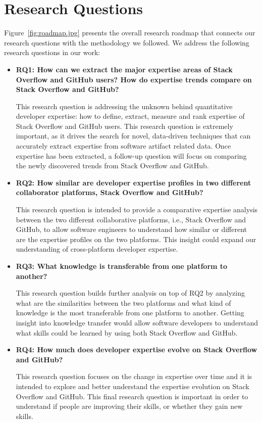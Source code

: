    \section{Research Questions\label{sec:RQs}}

        Figure~\ref{fig:roadmap.jpg} presents the overall research roadmap that connects our research questions with the methodology we followed. We address the following research questions in our work:
       
        \begin{itemize}
            \item \textbf{RQ1: How can we extract the major expertise areas of Stack Overflow and GitHub users? How do expertise trends compare on Stack Overflow and GitHub?}
            
            This research question is addressing the unknown behind quantitative developer expertise: how to define, extract, measure and rank expertise of Stack Overflow and GitHub users. This research question is extremely important, as it drives the search for novel, data-driven techniques that can accurately extract expertise from software artifact related data. Once expertise has been extracted, a follow-up question will focus on comparing the newly discovered trends from Stack Overflow and GitHub.
            
            \item \textbf{RQ2: How similar are developer expertise profiles in two different collaborator platforms, Stack Overflow and GitHub?}
            
            This research question is intended to provide a comparative expertise analysis between the two different collaborative platforms, i.e., Stack Overflow and GitHub, to allow software engineers to understand how similar or different are the expertise profiles on the two platforms. This insight could expand our understanding of cross-platform developer expertise.
            
            \item \textbf{RQ3: What knowledge is transferable from one platform to another?}
            
            This research question builds further analysis on top of RQ2 by analyzing what are the similarities between the two platforms and what kind of knowledge is the most transferable from one platform to another. Getting insight into knowledge transfer would allow software developers to understand what skills could be learned by using both Stack Overflow and GitHub.
            
            \item \textbf{RQ4: How much does developer expertise evolve on Stack Overflow and GitHub?}
            
            This research question focuses on the change in expertise over time and it is intended to explore and better understand the expertise evolution on Stack Overflow and GitHub. This final research question is important in order to understand if people are improving their skills, or whether they gain new skills.
        \end{itemize}
        
